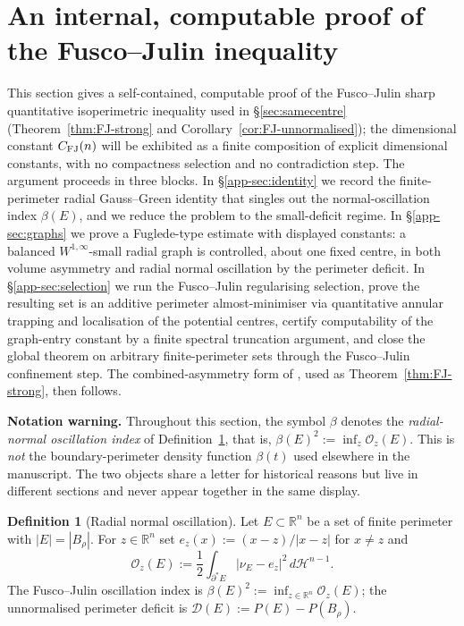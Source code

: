 \documentclass[11pt]{amsart}
\theoremstyle{definition}
\newtheorem{definition}[theorem]{Definition}
\newcommand{\R}{\mathbb R}
\newcommand{\Hn}{\mathcal H^{n-1}}
\newcommand{\Per}{P}
\newcommand{\osc}{\mathcal O}
\newcommand{\Def}{\mathcal D}
\begin{document}
\section{An internal, computable proof of the Fusco--Julin inequality}\label{sec:FJ-quantitative}\label{app:FJ-quantitative}


This section gives a self-contained, computable proof of the Fusco--Julin
sharp quantitative isoperimetric inequality used in \S\ref{sec:samecentre}
(Theorem~\ref{thm:FJ-strong} and Corollary~\ref{cor:FJ-unnormalised}); the
dimensional constant \(C_{\rm FJ}(n)\) will be exhibited as a finite
composition of explicit dimensional constants, with no compactness
selection and no contradiction step.  The argument proceeds in three
blocks.  In \S\ref{app-sec:identity} we record the finite-perimeter radial
Gauss--Green identity that singles out the normal-oscillation index
\(\beta(E)\), and we reduce the problem to the small-deficit regime.  In
\S\ref{app-sec:graphs} we prove a Fuglede-type estimate with displayed
constants: a balanced \(W^{1,\infty}\)-small radial graph is controlled,
about one fixed centre, in both volume asymmetry and radial normal
oscillation by the perimeter deficit.  In \S\ref{app-sec:selection} we
run the Fusco--Julin regularising selection, prove the resulting set is
an additive perimeter almost-minimiser via quantitative annular trapping
and localisation of the potential centres, certify computability of the
graph-entry constant by a finite spectral truncation argument, and close
the global theorem on arbitrary finite-perimeter sets through the
Fusco--Julin confinement step.  The combined-asymmetry form of
\cite{FJ2014}, used as Theorem~\ref{thm:FJ-strong}, then follows.

\medskip\noindent\textbf{Notation warning.}
Throughout this section, the symbol \(\beta\) denotes the
\emph{radial-normal oscillation index} of Definition~\ref{app-def:beta},
that is, \(\beta(E)^2:=\inf_z\osc_z(E)\).  This is \emph{not} the
boundary-perimeter density function \(\beta(t)\) used elsewhere in the
manuscript.  The two objects share a letter for historical reasons but
live in different sections and never appear together in the same
display.

\begin{definition}[Radial normal oscillation]\label{app-def:beta}
Let \(E\subset\R^n\) be a set of finite perimeter with \(|E|=|B_\rho|\).  For
\(z\in\R^n\) set \(e_z(x):=(x-z)/|x-z|\) for \(x\ne z\) and
\[
   \osc_z(E):=\frac12\int_{\partial^*E}|\nu_E-e_z|^2\,d\Hn.
\]
The Fusco--Julin oscillation index is
\(\beta(E)^2:=\inf_{z\in\R^n}\osc_z(E)\); the unnormalised perimeter deficit is
\(\Def(E):=\Per(E)-\Per(B_\rho)\).
\end{definition}
\end{document}
